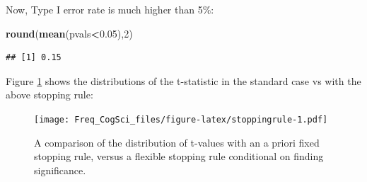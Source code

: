 \documentclass[12pt,]{krantz}
\newenvironment{Shaded}{\begin{snugshade}}{\end{snugshade}}
\newcommand{\CommentTok}[1]{\textcolor[rgb]{0.56,0.35,0.01}{\textit{#1}}}
\newcommand{\ControlFlowTok}[1]{\textcolor[rgb]{0.13,0.29,0.53}{\textbf{#1}}}
\newcommand{\DataTypeTok}[1]{\textcolor[rgb]{0.13,0.29,0.53}{#1}}
\newcommand{\DecValTok}[1]{\textcolor[rgb]{0.00,0.00,0.81}{#1}}
\newcommand{\FloatTok}[1]{\textcolor[rgb]{0.00,0.00,0.81}{#1}}
\newcommand{\KeywordTok}[1]{\textcolor[rgb]{0.13,0.29,0.53}{\textbf{#1}}}
\newcommand{\NormalTok}[1]{#1}
\newcommand{\OperatorTok}[1]{\textcolor[rgb]{0.81,0.36,0.00}{\textbf{#1}}}
\newcommand{\OtherTok}[1]{\textcolor[rgb]{0.56,0.35,0.01}{#1}}
\newcommand{\StringTok}[1]{\textcolor[rgb]{0.31,0.60,0.02}{#1}}
\begin{document}
\begin{Shaded}
\end{Shaded}

Now, Type I error rate is much higher than 5\%:

\begin{Shaded}
\begin{Highlighting}[]
\KeywordTok{round}\NormalTok{(}\KeywordTok{mean}\NormalTok{(pvals}\OperatorTok{<}\FloatTok{0.05}\NormalTok{),}\DecValTok{2}\NormalTok{)}
\end{Highlighting}
\end{Shaded}

\begin{verbatim}
## [1] 0.15
\end{verbatim}

Figure \ref{fig:stoppingrule} shows the distributions of the t-statistic in the standard case vs with the above stopping rule:

\begin{figure}
\centering
\texttt{[image: Freq\_CogSci\_files/figure-latex/stoppingrule-1.pdf]}
\caption{\label{fig:stoppingrule}A comparison of the distribution of t-values with an a priori fixed stopping rule, versus a flexible stopping rule conditional on finding significance.}
\end{figure}
\end{document}
